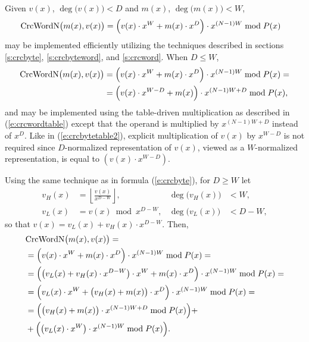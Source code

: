 \documentclass{article}
\begin{document}
Given $v(x)$, $\deg\bigl(v(x)\bigr) < D$ and $m(x)$, $\deg\bigl(m(x)\bigr) < W$,
\begin{align*}
    \mbox{CrcWordN}\bigl(m(x), v(x)\bigr)
    &= \Bigl(v(x) \cdot x^W + m(x) \cdot x^D \Bigr) \cdot x^{(N-1)W} \bmod P(x)
\end{align*}
may be implemented efficiently utilizing the techniques described in
sections \ref{s:crcbyte}, \ref{s:crcbyteword}, and \ref{s:crcword}. When $D
\leq W$,
  \begin{align*}
    \mbox{CrcWordN}\bigl(m(x), v(x)\bigr)
    &= \Bigl(v(x) \cdot x^W + m(x) \cdot x^D \Bigr) \cdot x^{(N-1)W} \bmod P(x) = \\
    &= \Bigl(v(x) \cdot x^{W-D} + m(x) \Bigr) \cdot x^{(N-1)W + D} \bmod P(x),
  \end{align*}
and may be implemented using the table-driven multiplication as described
in (\ref{e:crcwordtable}) except that the operand is multiplied by
$x^{(N-1)W+D}$ instead of $x^D$. Like in (\ref{e:crcbytetable2}), explicit
multiplication of $v(x)$ by $x^{W-D}$ is not required since $D$-normalized
representation of $v(x)$, viewed as a $W$-normalized representation, is
equal to $\left(v(x) \cdot x^{W-D}\right)$.

Using the same technique as in formula (\ref{e:crcbyte}), for $D \geq W$
let
  \begin{align*}
    v_H(x) &= \left\lfloor\frac{v(x)}{x^{D-W}}\right\rfloor,
        & \deg\bigl(v_H(x)\bigr) &< W, \\
    v_L(x) &= v(x) \bmod x^{D-W},
        & \deg\bigl(v_L(x)\bigr) &< D-W,
  \end{align*}
so that $v(x) = v_L(x) + v_H(x) \cdot x^{D-W}$. Then,
  \begin{align}
    & \mbox{CrcWordN}\bigl(m(x), v(x)\bigr) = \nonumber \\
    & = \Bigl(v(x) \cdot x^W + m(x) \cdot x^D \Bigr) \cdot x^{(N-1)W} \bmod P(x) = \nonumber \\
    & = \Bigl(\bigl(v_L(x) + v_H(x) \cdot x^{D-W}\bigr) \cdot x^W + m(x) \cdot x^D \Bigr) \cdot x^{(N-1)W} \bmod P(x) = \nonumber \\
    & = \Bigl(v_L(x) \cdot x^W + \bigl(v_H(x) + m(x)\bigr) \cdot x^D \Bigr) \cdot x^{(N-1)W} \bmod P(x) = \nonumber \\
    & = \Bigl(\bigl(v_H(x) + m(x)\bigr) \cdot x^{(N-1)W + D} \bmod P(x)\Bigr) + \nonumber \\
    &   + \Bigl(\bigl(v_L(x) \cdot x^W \bigr) \cdot x^{(N-1)W} \bmod P(x)\Bigr). \label{e:crcwordinterleaved}
  \end{align}
\end{document}
